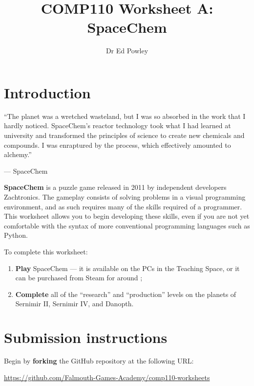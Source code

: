 \documentclass{../../fal_assignment}
\title{COMP110 Worksheet A: SpaceChem}
\author{Dr Ed Powley}
\begin{document}
\maketitle

\section*{Introduction}

\begin{marginquote}
``The planet was a wretched wasteland, but I was so absorbed in the work that I hardly noticed. SpaceChem's reactor technology took what I had learned at university and transformed the principles of science to create new chemicals and compounds. I was enraptured by the process, which effectively amounted to alchemy.''

--- SpaceChem
\end{marginquote}

\textbf{SpaceChem} is a puzzle game released in 2011 by independent developers Zachtronics. The gameplay consists of solving problems in a visual programming environment, and as such requires many of the skills required of a programmer. This worksheet allows you to begin developing these skills, even if you are not yet comfortable with the syntax of more conventional programming languages such as Python.

To complete this worksheet:
\begin{enumerate}[label=(\alph*)]
	\item \textbf{Play} SpaceChem --- it is available on the PCs in the Teaching Space,
		or it can be purchased from Steam for around ;
 	\item \textbf{Complete} all of the ``research'' and ``production'' levels on the planets of Sernimir II, Sernimir IV, and Danopth.
\end{enumerate}

\section*{Submission instructions}

Begin by \textbf{forking} the GitHub repository at the following URL:

\url{https://github.com/Falmouth-Games-Academy/comp110-worksheets}
\end{document}
